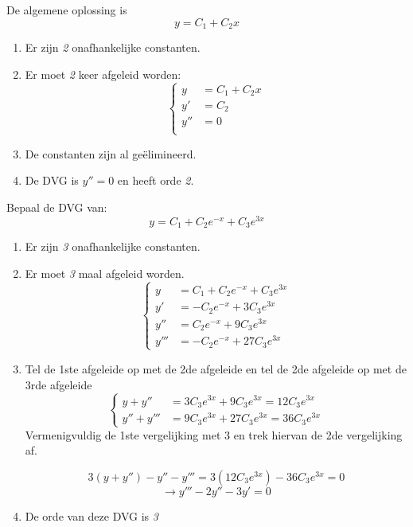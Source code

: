 {
De algemene oplossing is $$y = C_1 + C_2x$$
\begin{enumerate}
\item Er zijn \textit{2} onafhankelijke constanten.
\item Er moet \textit{2} keer afgeleid worden:
$$
    \begin{cases}
    y    & = C_1 + C_2x \\
    y'   & = C_2 \\
    y''  & = 0 \\
    \end{cases}
$$
\item De constanten zijn al geëlimineerd. 
\item De DVG is $y'' = 0$ en heeft orde \textit{2}.

\end{enumerate}
}

{
Bepaal de DVG van: $$y = C_1 + C_2e^{-x} + C_3e^{3x}$$
\begin{enumerate}
\item Er zijn \textit{3} onafhankelijke constanten.
\item Er moet \textit{3} maal afgeleid worden.
    \[ 
    \begin{cases}
            y & = C_1 + C_2e^{-x} + C_3e^{3x} \\
    y'     & = -C_2e^{-x} + 3C_3e^{3x}     \\
    y'' & = C_2e^{-x} + 9C_3e^{3x}      \\
    y''' & = -C_2e^{-x} + 27C_3e^{3x}
    \end{cases}
    \]

\item 
Tel de 1ste afgeleide op met de 2de afgeleide en tel de 2de afgeleide op met de 3rde afgeleide
\[
    \begin{cases}
    y + y''    & = 3C_3e^{3x} + 9C_3e^{3x} = 12C_3e^{3x}  \\
    y'' + y''' & = 9C_3e^{3x} + 27C_3e^{3x} = 36C_3e^{3x}
    \end{cases}
\]
Vermenigvuldig de 1ste vergelijking met 3 en trek hiervan de 2de vergelijking af.

$$3(y + y'') - y'' - y''' = 3(12C_3e^{3x}) - 36C_3e^{3x} = 0$$
$$\rightarrow y''' - 2y'' - 3y' = 0$$
\item
De orde van deze DVG is \textit{3}

\end{enumerate}
}

